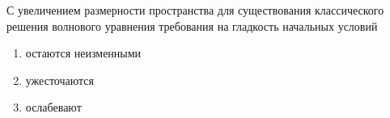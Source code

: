 С увеличением размерности пространства для существования классического решения волнового уравнения требования на гладкость начальных условий

\begin{enumerate}[label=\arabic*)]
    \item остаются неизменными
    \item ужесточаются
    \item ослабевают
\end{enumerate}

